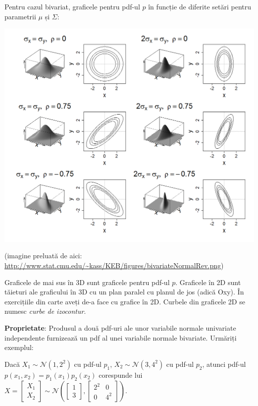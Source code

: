 \documentclass[12pt]{article}
\begin{document}
	Pentru cazul bivariat, graficele pentru pdf-ul $p$ în funcție de diferite setări pentru parametrii $\mu$ și $\Sigma$:
	
	\begin{center}
		\includegraphics[width=\linewidth]{screenshot002}
	\end{center}
	(imagine preluată de aici: \url{http://www.stat.cmu.edu/~kass/KEB/figures/bivariateNormalRev.png})
	
	Graficele de mai sus în 3D sunt graficele pentru pdf-ul $p$. Graficele în 2D sunt tăieturi ale graficului în 3D cu un plan paralel cu planul de jos (adică Oxy). În exercițiile din carte aveți de-a face cu grafice în 2D. Curbele din graficele 2D se numesc \textit{curbe de izocontur}.
	
	 
	
	\textbf{Proprietate}: Produsul a două pdf-uri ale unor variabile normale univariate independente furnizează un pdf al unei variabile normale bivariate. Urmăriți exemplul:
	
	Dacă $X_1 \sim \mathcal{N}(1,2^2)$ cu pdf-ul $p_1$, $X_2 \sim \mathcal{N}(3,4^2)$ cu pdf-ul $p_2$, atunci pdf-ul $p(x_1,x_2) = p_1(x_1) p_2(x_2)$ corespunde lui $X = \begin{bmatrix}
	X_1\\
	X_2
	\end{bmatrix} \sim \mathcal{N}\left(\begin{bmatrix}
	1\\
	3
	\end{bmatrix}, \begin{bmatrix}
	2^2 & 0 \\
	0 & 4^2
	\end{bmatrix} \right)$.
	
\end{document}
